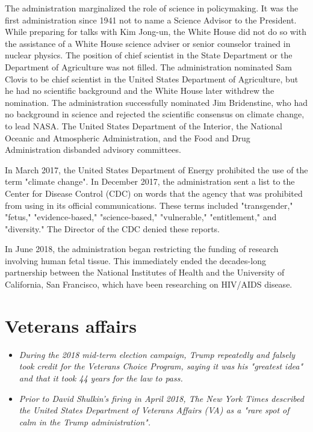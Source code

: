The administration marginalized the role of science in policymaking. It
was the first administration since 1941 not to name a Science Advisor to
the President. While preparing for talks with Kim Jong-un, the White
House did not do so with the assistance of a White House science adviser
or senior counselor trained in nuclear physics. The position of chief
scientist in the State Department or the Department of Agriculture was
not filled. The administration nominated Sam Clovis to be chief
scientist in the United States Department of Agriculture, but he had no
scientific background and the White House later withdrew the nomination.
The administration successfully nominated Jim Bridenstine, who had no
background in science and rejected the scientific consensus on climate
change, to lead NASA. The United States Department of the Interior, the
National Oceanic and Atmospheric Administration, and the Food and Drug
Administration disbanded advisory committees.

In March 2017, the United States Department of Energy prohibited the use
of the term "climate change". In December 2017, the administration sent
a list to the Center for Disease Control (CDC) on words that the agency
that was prohibited from using in its official communications. These
terms included "transgender," "fetus," "evidence-based,"
"science-based," "vulnerable," "entitlement," and "diversity." The
Director of the CDC denied these reports.

In June 2018, the administration began restricting the funding of
research involving human fetal tissue. This immediately ended the
decades-long partnership between the National Institutes of Health and
the University of California, San Francisco, which have been researching
on HIV/AIDS disease.

\section{Veterans affairs}\label{veterans-affairs}

\begin{itemize}
\item
  \emph{During the 2018 mid-term election campaign, Trump repeatedly and
  falsely took credit for the Veterans Choice Program, saying it was his
  "greatest idea" and that it took 44 years for the law to pass.}
\item
  \emph{Prior to David Shulkin's firing in April 2018, The New York
  Times described the United States Department of Veterans Affairs (VA)
  as a "rare spot of calm in the Trump administration".}
\end{itemize}

